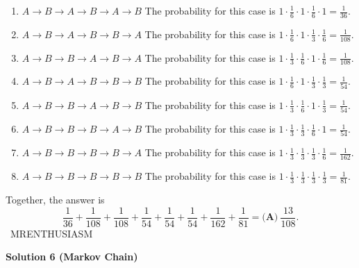 \begin{enumerate}
 
            \begin{enumerate} 
        \item $A \rightarrow B \rightarrow A \rightarrow B \rightarrow A \rightarrow B$ The probability for this case is $1\cdot\frac16\cdot1\cdot\frac16\cdot1=\frac{1}{36}.$


        \item $A \rightarrow B \rightarrow A \rightarrow B \rightarrow B \rightarrow A$ The probability for this case is $1\cdot\frac16\cdot1\cdot\frac13\cdot\frac16=\frac{1}{108}.$


        \item $A \rightarrow B \rightarrow B \rightarrow A \rightarrow B \rightarrow A$ The probability for this case is $1\cdot\frac13\cdot\frac16\cdot1\cdot\frac16=\frac{1}{108}.$


        \item $A \rightarrow B \rightarrow A \rightarrow B \rightarrow B \rightarrow B$ The probability for this case is $1\cdot\frac16\cdot1\cdot\frac13\cdot\frac13=\frac{1}{54}.$


        \item $A \rightarrow B \rightarrow B \rightarrow A \rightarrow B \rightarrow B$ The probability for this case is $1\cdot\frac13\cdot\frac16\cdot1\cdot\frac13=\frac{1}{54}.$


        \item $A \rightarrow B \rightarrow B \rightarrow B \rightarrow A \rightarrow B$ The probability for this case is $1\cdot\frac13\cdot\frac13\cdot\frac16\cdot1=\frac{1}{54}.$


        \item $A \rightarrow B \rightarrow B \rightarrow B \rightarrow B \rightarrow A$ The probability for this case is $1\cdot\frac13\cdot\frac13\cdot\frac13\cdot\frac16=\frac{1}{162}.$


        \item $A \rightarrow B \rightarrow B \rightarrow B \rightarrow B \rightarrow B$ The probability for this case is $1\cdot\frac13\cdot\frac13\cdot\frac13\cdot\frac13=\frac{1}{81}.$


            \end{enumerate}
            Together, the answer is 
 \[\frac{1}{36}+\frac{1}{108}+\frac{1}{108}+\frac{1}{54}+\frac{1}{54}+\frac{1}{54}+\frac{1}{162}+\frac{1}{81}=\boxed{\textbf{(A)}\ \frac{13}{108}}.\]~MRENTHUSIASM

 



\textbf{Solution 6 (Markov Chain)}


\end{enumerate}
